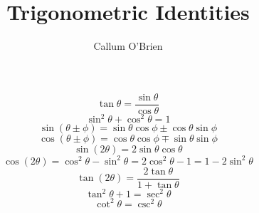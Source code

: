 \documentclass{article}
\begin{document}
\title{Trigonometric Identities}
\author{Callum O'Brien}
\date{}
\maketitle

\[\tan\theta = \frac{\sin\theta}{\cos\theta}\]
\[\sin^2\theta + \cos^2\theta = 1\]
\[\sin\left(\theta \pm \phi\right) = \sin\theta\cos\phi \pm \cos\theta\sin\phi\]
\[\cos\left(\theta \pm \phi\right) = \cos\theta\cos\phi \mp \sin\theta\sin\phi\]
\[\sin\left(2\theta\right) = 2\sin\theta\cos\theta\]
\[\cos\left(2\theta\right) = \cos^2\theta - \sin^2\theta = 2\cos^2\theta - 1 = 1 - 2\sin^2 \theta\]
\[\tan\left(2\theta\right) = \frac{2\tan\theta}{1+\tan\theta}\]
\[\tan^2\theta + 1 = \sec^2 \theta\]
\[\cot^2 \theta = \csc^2 \theta\]
\end{document}
